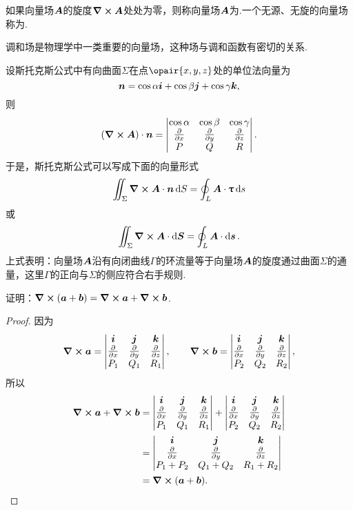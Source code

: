 \begin{definition}
如果向量场\(\boldsymbol{A}\)的旋度\(\curl{\boldsymbol{A}}\)处处为零，则称向量场\(\boldsymbol{A}\)为.一个无源、无旋的向量场称为.
\end{definition}
调和场是物理学中一类重要的向量场，这种场与调和函数有密切的关系.

设斯托克斯公式中有向曲面\(\Sigma\)在点\(\opair{x,y,z}\)处的单位法向量为\[
\boldsymbol{n} = \cos\alpha \boldsymbol{i} + \cos\beta \boldsymbol{j} + \cos\gamma \boldsymbol{k},
\]则\[
(\curl{\boldsymbol{A}}) \cdot \boldsymbol{n} = \begin{vmatrix}
\cos\alpha & \cos\beta & \cos\gamma \\
\pdv{x} & \pdv{y} & \pdv{z} \\
P & Q & R \\
\end{vmatrix}.
\]于是，斯托克斯公式可以写成下面的向量形式\[
\iint_{\Sigma} \curl{\boldsymbol{A}} \cdot \boldsymbol{n} \dd{S} = \oint_L \boldsymbol{A} \cdot \boldsymbol{\uptau} \dd{s}
\]或\[
\iint_{\Sigma} \curl{\boldsymbol{A}} \cdot \dd{\boldsymbol{S}} = \oint_L \boldsymbol{A} \cdot \dd{\boldsymbol{s}}.
\]上式表明：向量场\(\boldsymbol{A}\)沿有向闭曲线\(\Gamma\)的环流量等于向量场\(\boldsymbol{A}\)的旋度通过曲面\(\Sigma\)的通量，这里\(\Gamma\)的正向与\(\Sigma\)的侧应符合右手规则.

\begin{example}
证明：\(\curl(\boldsymbol{a}+\boldsymbol{b}) = \curl\boldsymbol{a} + \curl\boldsymbol{b}\).
\begin{proof}
因为\[
\curl\boldsymbol{a} = \begin{vmatrix}
\boldsymbol{i} & \boldsymbol{j} & \boldsymbol{k} \\
\pdv{x} & \pdv{y} & \pdv{z} \\
P_1 & Q_1 & R_1
\end{vmatrix},
\qquad
\curl\boldsymbol{b} = \begin{vmatrix}
\boldsymbol{i} & \boldsymbol{j} & \boldsymbol{k} \\
\pdv{x} & \pdv{y} & \pdv{z} \\
P_2 & Q_2 & R_2
\end{vmatrix},
\]所以\begin{align*}
\curl\boldsymbol{a} + \curl\boldsymbol{b}
&= \begin{vmatrix}
\boldsymbol{i} & \boldsymbol{j} & \boldsymbol{k} \\
\pdv{x} & \pdv{y} & \pdv{z} \\
P_1 & Q_1 & R_1
\end{vmatrix} + \begin{vmatrix}
\boldsymbol{i} & \boldsymbol{j} & \boldsymbol{k} \\
\pdv{x} & \pdv{y} & \pdv{z} \\
P_2 & Q_2 & R_2
\end{vmatrix} \\
&= \begin{vmatrix}
\boldsymbol{i} & \boldsymbol{j} & \boldsymbol{k} \\
\pdv{x} & \pdv{y} & \pdv{z} \\
P_1 + P_2 & Q_1 + Q_2 & R_1 + R_2
\end{vmatrix} \\
&= \curl(\boldsymbol{a}+\boldsymbol{b}). \qedhere
\end{align*}
\end{proof}
\end{example}

